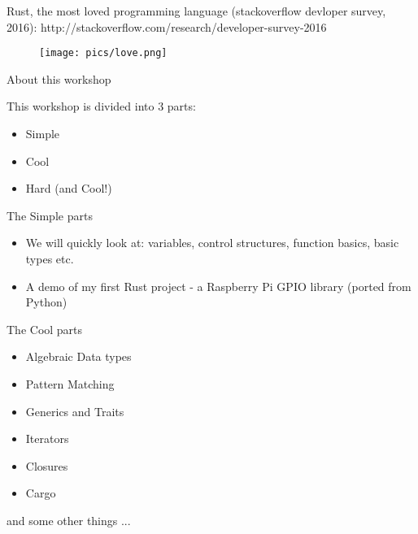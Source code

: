 \documentclass{beamer}
\begin{document}
\begin{frame}{}

Rust, the most loved programming language (stackoverflow
devloper survey, 2016): 
http://stackoverflow.com/research/developer-survey-2016

\begin{figure}
\texttt{[image: pics/love.png]}
\end{figure}

\end{frame}
\begin{frame}{About this workshop}

This workshop is divided into 3 parts:

\begin{itemize}

\item Simple 

\item Cool  

\item Hard (and Cool!)

\end{itemize}

\end{frame}
\begin{frame}{The Simple parts}

\begin{itemize}

\item We will quickly look at: variables, control structures,
      function basics, basic types etc.

\item A demo of my first Rust project - a Raspberry Pi
      GPIO library (ported from Python)

\end{itemize}

\end{frame}

\begin{frame}{The Cool parts}

\begin{itemize}

\item Algebraic Data types

\item Pattern Matching

\item Generics and Traits

\item Iterators

\item Closures

\item Cargo
      
\end{itemize}

and some other things ...

\end{frame}
\end{document}
